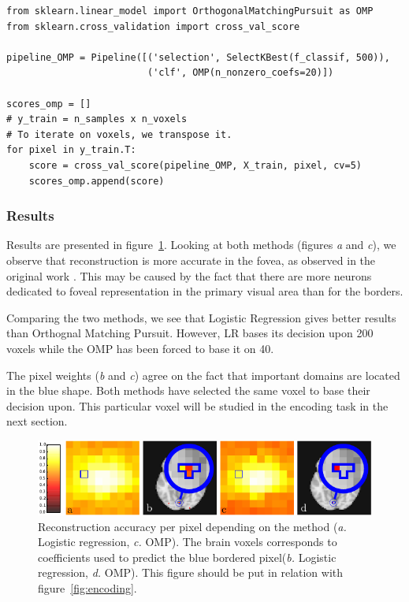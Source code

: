 \documentclass{frontiersSCNS} %
\begin{document}
\begin{lstlisting}
from sklearn.linear_model import OrthogonalMatchingPursuit as OMP
from sklearn.cross_validation import cross_val_score

pipeline_OMP = Pipeline([('selection', SelectKBest(f_classif, 500)),
                         ('clf', OMP(n_nonzero_coefs=20)])

scores_omp = []
# y_train = n_samples x n_voxels
# To iterate on voxels, we transpose it.
for pixel in y_train.T:
    score = cross_val_score(pipeline_OMP, X_train, pixel, cv=5)
    scores_omp.append(score)
\end{lstlisting}

\subsubsection{Results}

Results are presented in figure~\ref{fig:decoding}.
Looking at both methods (figures \textit{a} and \textit{c}), we observe that reconstruction
is more accurate in the fovea, as observed in the original work \citep{miyawaki2008}.
This may be caused by the fact that there are more neurons dedicated to foveal
representation in the primary visual area than for the borders.

Comparing the two methods, we see that Logistic Regression gives better results
than Orthognal Matching Pursuit. However, LR bases its decision upon 200 voxels
while the OMP has been forced to base it on 40.

The pixel weights (\textit{b} and \textit{c}) agree on the fact that important
domains are located in the blue shape.
Both methods have selected the same voxel to base their decision upon.
This particular voxel will be studied in the encoding task in the next section.

\begin{figure}[hbtp]
  \begin{center}
    \includegraphics[width=\linewidth]{img/kamitani/figure_decoding}
  \end{center}
  \caption{Reconstruction accuracy per pixel depending on the method (\textit{a.} Logistic
      regression, \textit{c.} OMP). The brain voxels
  corresponds to coefficients used to predict the blue bordered pixel(\textit{b.} Logistic
      regression, \textit{d.} OMP). This
  figure should be put in relation with figure~\ref{fig:encoding}.}
\label{fig:decoding}
\end{figure}
\end{document}
